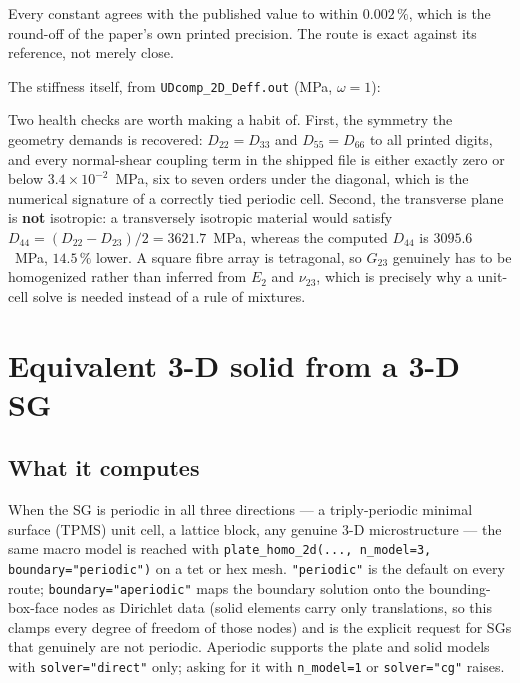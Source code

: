 Every constant agrees with the published value to within $0.002\,\%$, which is
the round-off of the paper's own printed precision. The route is exact against
its reference, not merely close.

The stiffness itself, from \texttt{UDcomp\_2D\_Deff.out} (MPa, $\omega = 1$):
%

Two health checks are worth making a habit of. First, the symmetry the geometry
demands is recovered: $D_{22} = D_{33}$ and $D_{55} = D_{66}$ to all printed
digits, and every normal-shear coupling term in the shipped file is either
exactly zero or below $3.4\times10^{-2}$~MPa, six to seven orders under the
diagonal, which is the numerical signature of a correctly tied periodic cell.
Second, the transverse plane is \textbf{not} isotropic: a transversely isotropic
material would satisfy $D_{44} = (D_{22} - D_{23})/2 = 3621.7$~MPa, whereas the
computed $D_{44}$ is $3095.6$~MPa, $14.5\,\%$ lower. A square fibre array is
tetragonal, so $G_{23}$ genuinely has to be homogenized rather than inferred
from $E_2$ and $\nu_{23}$, which is precisely why a unit-cell solve is needed
instead of a rule of mixtures.

\section{Equivalent 3-D solid from a 3-D SG}
\label{sec:solid-3dfrom3d}

\subsection{What it computes}

When the SG is periodic in all three directions --- a triply-periodic minimal
surface (TPMS) unit cell, a lattice block, any genuine 3-D microstructure ---
the same macro model is reached with
\texttt{plate\_homo\_2d(..., n\_model=3, boundary="periodic")} on a tet or hex
mesh. \texttt{"periodic"} is the default on every route;
\texttt{boundary="aperiodic"} maps the boundary solution onto the
bounding-box-face nodes as Dirichlet data (solid elements carry only
translations, so this clamps every degree of freedom of those nodes) and is the
explicit request for SGs that genuinely are not periodic. Aperiodic supports the
plate and solid models with \texttt{solver="direct"} only; asking for it with
\texttt{n\_model=1} or \texttt{solver="cg"} raises.

